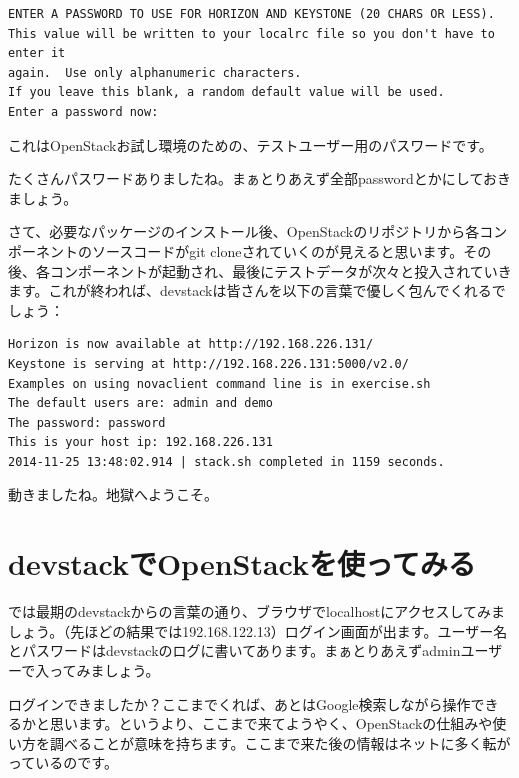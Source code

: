 \documentclass[9pt,b5paper,tombo,openany,dvipdfmx]{jsbook}
\begin{document}
\begin{lstlisting}
ENTER A PASSWORD TO USE FOR HORIZON AND KEYSTONE (20 CHARS OR LESS).
This value will be written to your localrc file so you don't have to enter it
again.  Use only alphanumeric characters.
If you leave this blank, a random default value will be used.
Enter a password now:
\end{lstlisting}

これはOpenStackお試し環境のための、テストユーザー用のパスワードです。

たくさんパスワードありましたね。まぁとりあえず全部passwordとかにしておきましょう。

さて、必要なパッケージのインストール後、OpenStackのリポジトリから各コンポーネントのソースコードがgit cloneされていくのが見えると思います。その後、各コンポーネントが起動され、最後にテストデータが次々と投入されていきます。これが終われば、devstackは皆さんを以下の言葉で優しく包んでくれるでしょう：

\begin{lstlisting}
Horizon is now available at http://192.168.226.131/
Keystone is serving at http://192.168.226.131:5000/v2.0/
Examples on using novaclient command line is in exercise.sh
The default users are: admin and demo
The password: password
This is your host ip: 192.168.226.131
2014-11-25 13:48:02.914 | stack.sh completed in 1159 seconds.
\end{lstlisting}

動きましたね。地獄へようこそ。

\section{devstackでOpenStackを使ってみる}

では最期のdevstackからの言葉の通り、ブラウザでlocalhostにアクセスしてみましょう。（先ほどの結果では192.168.122.13）ログイン画面が出ます。ユーザー名とパスワードはdevstackのログに書いてあります。まぁとりあえずadminユーザーで入ってみましょう。

ログインできましたか？ここまでくれば、あとはGoogle検索しながら操作できるかと思います。というより、ここまで来てようやく、OpenStackの仕組みや使い方を調べることが意味を持ちます。ここまで来た後の情報はネットに多く転がっているのです。
\end{document}
